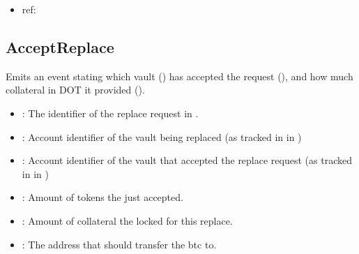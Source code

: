 \documentclass[a4paper,10pt,english]{sphinxmanual}
\begin{document}
\begin{itemize}
\item {} 
ref:

\end{itemize}


\subsection{AcceptReplace}
\label{\detokenize{spec/replace:id15}}
Emits an event stating which vault () has accepted the  request (), and how much collateral in DOT it provided ().



\begin{itemize}
\item {} 
: The identifier of the replace request in .

\item {} 
: Account identifier of the vault being replaced (as tracked in  in {\hyperref[\detokenize{spec/vault-registry:vault-registry}]{}})

\item {} 
: Account identifier of the vault that accepted the replace request (as tracked in  in {\hyperref[\detokenize{spec/vault-registry:vault-registry}]{}})

\item {} 
: Amount of tokens the  just accepted.

\item {} 
: Amount of collateral the  locked for this replace.

\item {} 
: The address that  should transfer the btc to.

\end{itemize}
\end{document}
